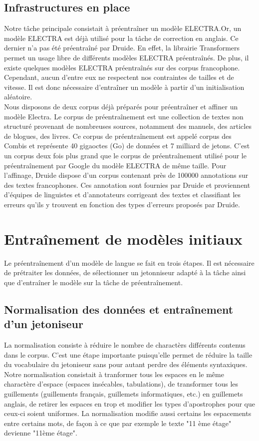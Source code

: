 \documentclass[12pt,twoside,maitrise]{dms}
\theoremstyle{definition}
\numberwithin{equation}{section}
\numberwithin{table}{chapter}
\numberwithin{figure}{chapter}
\begin{document}
\section{Infrastructures en place}
Notre tâche principale consistait à préentraîner un modèle ELECTRA.\@ Or, un
modèle ELECTRA est déjà utilisé pour la tâche de correction en anglais. Ce
dernier n'a pas été préentraîné par Druide. En effet, la librairie
Transformers\cite{wolf-etal-2020-transformers} permet un usage libre de
différents modèles ELECTRA préentraînés. De plus, il existe quelques modèles
ELECTRA préentraînés sur des corpus francophone. Cependant, aucun d'entre eux
ne respectent nos contraintes de tailles et de vitesse. Il est donc nécessaire
d'entraîner un modèle à partir d'un initialisation aléatoire.\\

Nous disposons de deux corpus déjà préparés pour préentraîner et affiner un
modèle Electra. Le corpus de préentraînement est une collection de textes non
structuré provenant de nombreuses sources, notamment des manuels, des articles
de blogues, des livres. Ce corpus de préentraînement est appelé corpus des
Combis et représente 40 gigaoctes (Go) de données et 7 milliard de jetons.
C'est un corpus deux fois plus grand que le corpus de préentraînement utilisé
pour le préentraînement par Google du modèle ELECTRA de même taille. Pour
l'affinage, Druide dispose d'un corpus contenant près de 100000 annotations sur
des textes francophones. Ces annotation sont fournies par Druide et proviennent
d'équipes de linguistes et d'annotateurs corrigeant des textes et classifiant
les erreurs qu'ils y trouvent en fonction des types d'erreurs proposés par
Druide.


\chapter{Entraînement de modèles initiaux}
Le préentraînement d'un modèle de langue se fait en trois étapes. Il est
nécessaire de prétraiter les données, de sélectionner un jetonniseur adapté à
la tâche ainsi que d'entraîner le modèle sur la tâche de préentraînement.

\section{Normalisation des données et entraînement d'un jetoniseur}
La normalisation consiste à réduire le nombre de charactèrs différents contenus
dans le corpus. C'est une étape importante puisqu'elle permet de réduire la
taille du vocabulaire du jetoniseur sans pour autant perdre des éléments
syntaxiques. Notre normalisation consistait à tranformer tous les espaces en le
même charactère d'espace (espaces insécables, tabulations), de transformer tous
les guillements (guillements français, guillemets informatiques, etc.) en
guillemets anglais, de retirer les espaces en trop et modifier les types
d'apostrophes pour que ceux-ci soient uniformes. La normalisation modifie aussi
certains les espacements entre certains mots, de façon à ce que par exemple le
texte "11 ème étage" devienne "11ème étage".\\%
\end{document}
